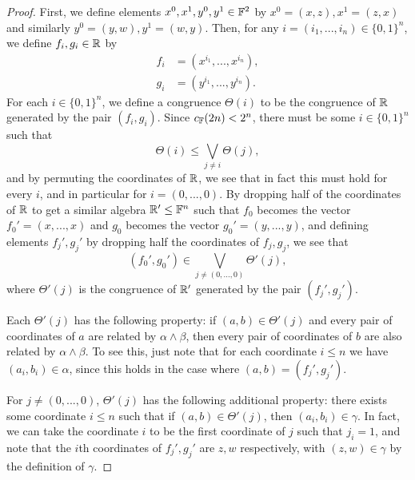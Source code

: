 \documentclass[letterpaper,11pt]{article}
\begin{document}
\begin{proof}
First, we define elements $x^0, x^1, y^0, y^1 \in \mathbb{F}^2$ by $x^0 = (x,z), x^1 = (z,x)$ and similarly $y^0 = (y,w), y^1 = (w,y)$. Then, for any $i = (i_1, ..., i_n) \in \{0,1\}^n$, we define $f_i, g_i \in \mathbb{R}$ by
\begin{align*}
f_i &= (x^{i_1}, ..., x^{i_n}),\\
g_i &= (y^{i_1}, ..., y^{i_n}).
\end{align*}
For each $i \in \{0,1\}^n$, we define a congruence $\Theta(i)$ to be the congruence of $\mathbb{R}$ generated by the pair $(f_i, g_i)$. Since $c_{\mathbb{F}}(2n) < 2^n$, there must be some $i \in \{0,1\}^n$ such that
\[
\Theta(i) \le \bigvee_{j \ne i} \Theta(j),
\]
and by permuting the coordinates of $\mathbb{R}$, we see that in fact this must hold for every $i$, and in particular for $i = (0, ..., 0)$. By dropping half of the coordinates of $\mathbb{R}$ to get a similar algebra $\mathbb{R}' \le \mathbb{F}^n$ such that $f_0$ becomes the vector $f_0' = (x, ..., x)$ and $g_0$ becomes the vector $g_0' = (y, ..., y)$, and defining elements $f_j', g_j'$ by dropping half the coordinates of $f_j, g_j$, we see that
\[
(f_0', g_0') \in \bigvee_{j \ne (0, ..., 0)} \Theta'(j),
\]
where $\Theta'(j)$ is the congruence of $\mathbb{R}'$ generated by the pair $(f_j', g_j')$.

Each $\Theta'(j)$ has the following property: if $(a,b) \in \Theta'(j)$ and every pair of coordinates of $a$ are related by $\alpha \wedge \beta$, then every pair of coordinates of $b$ are also related by $\alpha \wedge \beta$. To see this, just note that for each coordinate $i \le n$ we have $(a_i,b_i) \in \alpha$, since this holds in the case where $(a,b) = (f_j', g_j')$.

For $j \ne (0, ..., 0)$, $\Theta'(j)$ has the following additional property: there exists some coordinate $i \le n$ such that if $(a,b) \in \Theta'(j)$, then $(a_i,b_i) \in \gamma$. In fact, we can take the coordinate $i$ to be the first coordinate of $j$ such that $j_i = 1$, and note that the $i$th coordinates of $f_j', g_j'$ are $z, w$ respectively, with $(z,w) \in \gamma$ by the definition of $\gamma$.


\end{proof}
\end{document}

